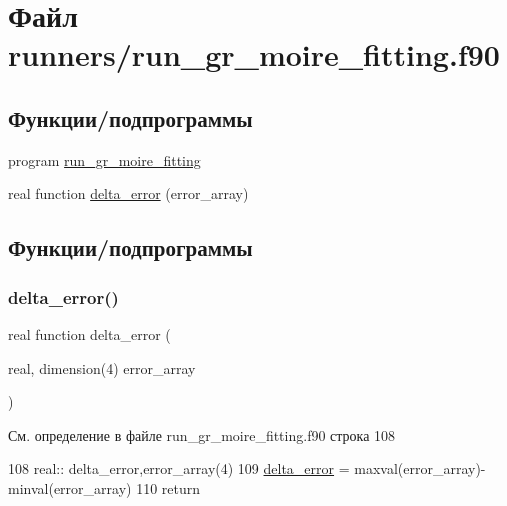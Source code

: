 \hypertarget{run__gr__moire__fitting_8f90}{}\section{Файл runners/run\+\_\+gr\+\_\+moire\+\_\+fitting.f90}
\label{run__gr__moire__fitting_8f90}
\subsection*{Функции/подпрограммы}
\begin{DoxyCompactItemize}
\item 
program \mbox{\hyperlink{run__gr__moire__fitting_8f90_a3f54721279f970a03ea533479dbc2bd1}{run\+\_\+gr\+\_\+moire\+\_\+fitting}}
\item 
real function \mbox{\hyperlink{run__gr__moire__fitting_8f90_ab2a5771666cbc7ef9aff145187640f68}{delta\+\_\+error}} (error\+\_\+array)
\end{DoxyCompactItemize}


\subsection{Функции/подпрограммы}
\mbox{\label{run__gr__moire__fitting_8f90_ab2a5771666cbc7ef9aff145187640f68}} 
\subsubsection{\texorpdfstring{delta\+\_\+error()}{delta\_error()}}
{\footnotesize\ttfamily real function delta\+\_\+error (\begin{DoxyParamCaption}\item[{real, dimension(4)}]{error\+\_\+array }\end{DoxyParamCaption})}



См. определение в файле run\+\_\+gr\+\_\+moire\+\_\+fitting.\+f90 строка 108


\begin{DoxyCode}
108     \textcolor{keywordtype}{real}:: delta\_error,error\_array(4)
109     \mbox{\hyperlink{run__gr__moire__fitting_8f90_ab2a5771666cbc7ef9aff145187640f68}{delta\_error}} = maxval(error\_array)-minval(error\_array)
110     \textcolor{keywordflow}{return}
\end{DoxyCode}
\mbox{\label{run__gr__moire__fitting_8f90_a3f54721279f970a03ea533479dbc2bd1}} 
